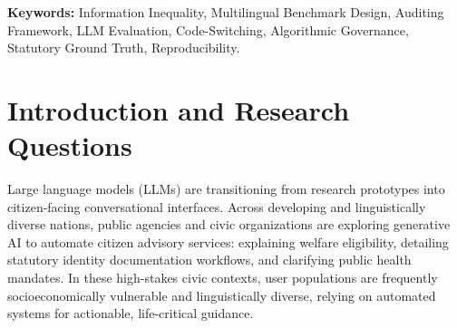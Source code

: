 \documentclass[11pt,a4paper]{article}
\begin{document}
\begin{abstract}
\vspace{0.5em}
\noindent\textbf{Scientific and Validation Disclosures:}
\begin{enumerate}
  \item \textbf{Framework Scope:} This manuscript presents a benchmark-design and reproducibility framework; it does \textbf{not} report empirical comparisons or rankings of live LLMs.
  \item \textbf{Software Verification Fixtures:} The 5,400 records in the dataset are deterministic, programmatic baseline fixtures instantiated to verify schema compliance and pipeline integrity---\textbf{not} genuine outputs from commercial model endpoints.
  \item \textbf{Pending Evaluator Validation:} A prior automated evaluator validation was found to rely on cloned synthetic references and was quarantined. All 13 quality metrics remain empirically unvalidated pending genuine bilingual human annotation.
  \item \textbf{Pre-Registration Gate:} Live model API execution (data collection) and human evaluator calibration (measurement validation) represent separate future activities that precede downstream empirical estimation.
\end{enumerate}
\end{abstract}

\vspace{0.5em}
\noindent\textbf{Keywords:} Information Inequality, Multilingual Benchmark Design, Auditing Framework, LLM Evaluation, Code-Switching, Algorithmic Governance, Statutory Ground Truth, Reproducibility.

\vspace{1em}

\section{Introduction and Research Questions}
\label{sec:intro}

Large language models (LLMs) are transitioning from research prototypes into citizen-facing conversational interfaces. Across developing and linguistically diverse nations, public agencies and civic organizations are exploring generative AI to automate citizen advisory services: explaining welfare eligibility, detailing statutory identity documentation workflows, and clarifying public health mandates. In these high-stakes civic contexts, user populations are frequently socioeconomically vulnerable and linguistically diverse, relying on automated systems for actionable, life-critical guidance.
\end{document}

